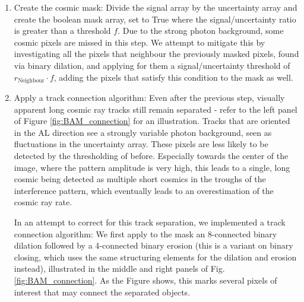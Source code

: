 \documentclass[a4paper, 11pt]{article}
\begin{document}
\begin{enumerate}
  \item Create the cosmic mask: Divide the signal array by the uncertainty array and create the boolean mask array, set to True where the signal/uncertainty ratio is greater than a threshold $f$. Due to the strong photon background, some cosmic pixels are missed in this step. We attempt to mitigate this by investigating all the pixels that neighbour the previously masked pixels, found via binary dilation, and applying for them a signal/uncertainty threshold of $r_\mathrm{Neighbour} \cdot f$, adding the pixels that satisfy this condition to the mask as well.
  \item \label{item:connectAlg} Apply a track connection algorithm: Even after the previous step, visually apparent long cosmic ray tracks still remain separated - refer to the left panel of Figure \ref{fig:BAM_connection} for an illustration. Tracks that are oriented in the AL direction see a strongly variable photon background, seen as fluctuations in the uncertainty array. These pixels are less likely to be detected by the thresholding of before. Especially towards the center of the image, where the pattern amplitude is very high, this leads to a single, long cosmic being detected as multiple short cosmics in the troughs of the interference pattern, which eventually leads to an overestimation of the cosmic ray rate.

    In an attempt to correct for this track separation, we implemented a track connection algorithm: We first apply to the mask an 8-connected binary dilation followed by a 4-connected binary erosion (this is a variant on binary closing, which uses the same structuring elements for the dilation and erosion instead), illustrated in the middle and right panels of Fig. \ref{fig:BAM_connection}. As the Figure shows, this marks several pixels of interest that may connect the separated objects.


\end{enumerate}
\end{document}
